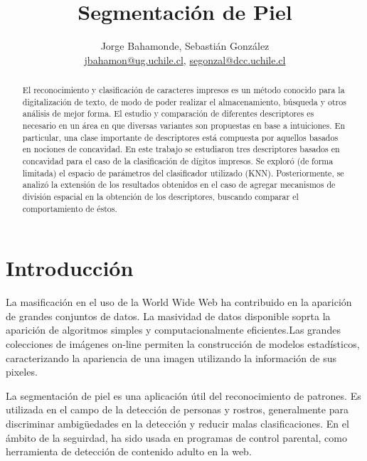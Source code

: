 \documentclass[12pt]{article}
\title{Segmentación de Piel}
\author{Jorge Bahamonde, Sebastián González\\
\small{\url{jbahamon@ug.uchile.cl}, \url{segonzal@dcc.uchile.cl}}}
\date{}
\begin{document}
\maketitle

\begin{abstract}
    El reconocimiento y clasificación de caracteres impresos es un método
    conocido para la digitalización de texto, de modo de poder realizar el
    almacenamiento, búsqueda y otros análisis de mejor forma.  El estudio y
    comparación de diferentes descriptores es necesario en un área en que
    diversas variantes son propuestas en base a intuiciones. En particular, una
    clase importante de descriptores está compuesta por aquellos basados en
    nociones de concavidad. En este trabajo se estudiaron tres descriptores
    basados en concavidad para el caso de la clasificación de dígitos impresos.
    Se exploró (de forma limitada) el espacio de parámetros del clasificador
    utilizado (KNN). Posteriormente, se analizó la extensión de los resultados
    obtenidos en el caso de agregar mecanismos de división espacial en la
    obtención de los descriptores, buscando comparar el comportamiento de éstos.
\end{abstract}

\section{Introducción}


La masificación en el uso de la World Wide Web ha contribuido en la aparición de
grandes conjuntos de datos. La masividad de datos disponible soprta la aparición de
algoritmos simples y computacionalmente eficientes.Las grandes colecciones de imágenes on-line permiten
la construcción de modelos estadísticos, caracterizando la apariencia de una imagen utilizando
la información de sus pixeles.

La segmentación de piel es una aplicación útil del reconocimiento de patrones. Es utilizada en el campo de la detección de personas y rostros, generalmente
para discriminar ambigüedades en la detección y reducir malas clasificaciones. En el ámbito de la seguirdad, ha sido usada en programas de control parental, como herramienta de detección de contenido adulto en la web.
\end{document}
